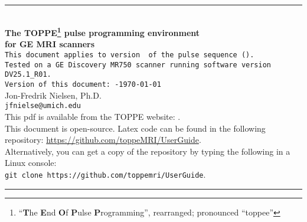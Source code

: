 

\begin{titlepage}
~\\[0.5in]
\begin{centering}
\rule{\textwidth}{5pt}
~\\[0.5in]
{\bf \huge The TOPPE\footnote{``\textbf{T}he \textbf{E}nd \textbf{O}f \textbf{P}ulse \textbf{P}rogramming'', rearranged; pronounced ``toppee''} pulse programming environment} \\ [0.4in]
{\bf \huge for GE MRI scanners} \\ [0.6in]
{\tt This document applies to version~\toppeversion~of the pulse sequence (\toppe).   } \\ [0.1in]
{\tt Tested on a GE Discovery MR750 scanner running software version DV25.1\_R01.   } \\ [0.6in]
{\tt Version of this document:~\toppeversion-\today} \\ [0.7in]
{\large Jon-Fredrik Nielsen, Ph.D.} \\ [0.1in]
{\tt jfnielse@umich.edu} \\ [0.8in]
This pdf is available from the TOPPE website: \toppeweb. \\ [0.25in]
This document is open-source. Latex code can be found in the following repository: \url{https://github.com/toppeMRI/UserGuide}. \\
Alternatively, you can get a copy of the repository by typing the following in a Linux console:\\
{\tt git clone https://github.com/toppemri/UserGuide}. \\ [0.2in]
\rule{\textwidth}{5pt}
\end{centering}
\end{titlepage}


